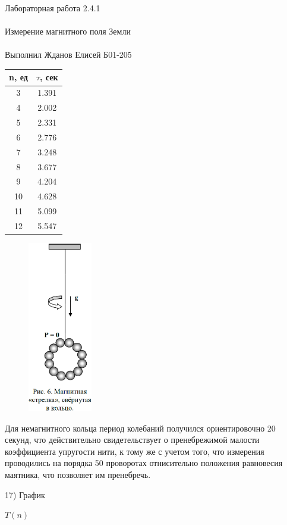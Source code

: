 \documentclass{astroedu-lab}
\begin{document}
\begin{problem}{\huge Лабораторная работа 2.4.1\\\\Измерение магнитного поля Земли\\\\Выполнил Жданов Елисей Б01-205}
\begin{center}
\begin{tabular}{|c|c|}
\hline 
n, ед & $\tau$, сек \\
\hline
3 & 1.391 \\
4 & 2.002 \\
5 & 2.331 \\
6 & 2.776 \\
7 & 3.248 \\
\hline
8 & 3.677 \\
9 & 4.204 \\
10& 4.628 \\
11& 5.099 \\
12& 5.547 \\
\hline
\end{tabular}
\end{center}

\newpage

\begin{figure}[!h]
	\centering
	\includegraphics[width=0.25\textwidth]{5.png}
	\label{fig:boiler}
\end{figure}

Для немагнитного кольца период колебаний получился ориентировочно 20 секунд, что действительно свидетельствует о пренебрежимой малости коэффициента упругости нити, к тому же с учетом того, что измерения проводились на порядка 50 проворотах отнисительно положения равновесия маятника, что позволяет им пренебречь.

\newpage

17) График

\begin{center}
	\Large $T(n)$
\end{center}


\end{problem}
\end{document}
